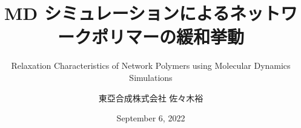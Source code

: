 \title{MD シミュレーションによるネットワークポリマーの緩和挙動}
\subtitle{Relaxation Characteristics of Network Polymers using Molecular Dynamics Simulations}
\author{東亞合成株式会社 佐々木裕}
\date{September 6, 2022}

\newcommand{\gakkai}{第71回 高分子討論会@北海道大学}